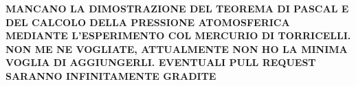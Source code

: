 \documentclass[a4paper,12pt, oneside]{book}
\begin{document}

\textbf{MANCANO LA DIMOSTRAZIONE DEL TEOREMA DI PASCAL E DEL CALCOLO DELLA PRESSIONE ATOMOSFERICA MEDIANTE L'ESPERIMENTO COL MERCURIO DI TORRICELLI. NON ME NE VOGLIATE, ATTUALMENTE NON HO LA MINIMA VOGLIA DI AGGIUNGERLI. EVENTUALI PULL REQUEST SARANNO INFINITAMENTE GRADITE}
\newpage
\end{document}
